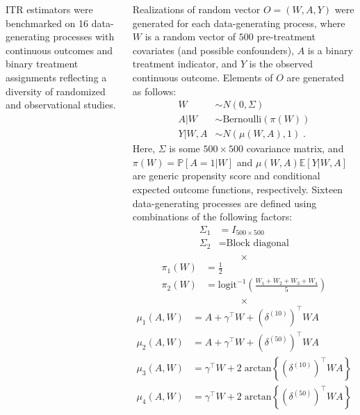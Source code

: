 \documentclass[25pt, a1paper, landscape, innermargin=-2in]{tikzposter}
\begin{document}
\begin{columns}
{    ITR estimators were benchmarked on 16 data-generating processes with
    continuous outcomes and binary treatment assignments reflecting a diversity
    of randomized and observational studies.

    Realizations of random vector $O = (W, A, Y)$ were generated for each
    data-generating process, where $W$ is a random vector of $500$ pre-treatment
    covariates (and possible confounders), $A$ is a binary treatment indicator,
    and $Y$ is the observed continuous outcome. Elements of $O$ are generated as
    follows:
    \begin{align*}
      W & \sim N(0, \Sigma) \\
      A|W & \sim \text{Bernoulli}(\pi(W)) \\
      Y|W, A & \sim N(\mu(W, A), 1) \;.
    \end{align*}
    Here, $\Sigma$ is some $500 \times 500$ covariance matrix, and $\pi(W) =
    \mathbb{P}[A=1|W]$ and $\mu(W,A) \mathbb{E}[Y|W, A]$ are generic propensity
    score and conditional expected outcome functions, respectively. Sixteen
    data-generating processes are defined using combinations of the following
    factors:
    \begin{equation*}
      \begin{split}
        \Sigma_{1} & = I_{500 \times 500} \\
        \Sigma_{2} & = \text{Block diagonal} \\
      \end{split}
    \end{equation*}
    \begin{equation*}
      \times
    \end{equation*}
    \begin{equation*}
      \begin{split}
        \pi_{1}(W) & = \frac{1}{2} \\
        \pi_{2}(W) & = \text{logit}^{-1}\left(\frac{W_{1} + W_{2} + W_{3} + W_{4}}{5}\right) \\
      \end{split}
    \end{equation*}
    \begin{equation*}
      \times
    \end{equation*}
    \begin{equation*}
      \begin{split}
        \mu_{1}(A, W) & = A + \gamma^{\top}W + (\delta^{(10)})^{\top}WA \\
        \mu_{2}(A, W) & = A + \gamma^{\top}W + (\delta^{(50)})^{\top}WA \\
        \mu_{3}(A, W) & = \gamma^{\top}W + 2\;\text{arctan}\left\{(\delta^{(10)})^{\top}WA\right\} \\
        \mu_{4}(A, W) & = \gamma^{\top}W + 2\;\text{arctan}\left\{(\delta^{(50)})^{\top}WA\right\} \\
      \end{split}
    \end{equation*}

}
\end{columns}
\end{document}
